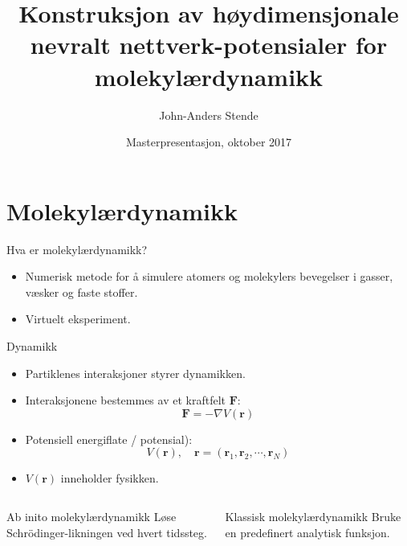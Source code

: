 \documentclass{beamer}
\title{Konstruksjon av høydimensjonale nevralt nettverk-potensialer for molekylærdynamikk}
\author{John-Anders Stende}
\institute{
  Fysisk institutt \\
  Universitetet i Oslo
}
\date{Masterpresentasjon, oktober 2017}
\begin{document}
\frame{\titlepage}

\section{Molekylærdynamikk}

\begin{frame}

\begin{block}{Hva er molekylærdynamikk?}
  \begin{itemize}
  \item Numerisk metode for å simulere atomers og molekylers bevegelser i gasser, væsker og faste stoffer.
  \item Virtuelt eksperiment.
  \end{itemize}
\end{block}

\end{frame}


\begin{frame}

\begin{block}{Dynamikk}
  \begin{itemize}
  \item Partiklenes interaksjoner styrer dynamikken.
  \item Interaksjonene bestemmes av et kraftfelt $\mathbf{F}$:
    \begin{equation*}
    \mathbf{F} = -\nabla V(\mathbf{r})
    \end{equation*}
  \item Potensiell energiflate / potensial):
    \begin{equation*}
      V(\mathbf{r}), \quad \mathbf{r} = (\mathbf{r}_1, \mathbf{r}_2, \cdots, \mathbf{r}_N)
    \end{equation*}
  \item $V(\mathbf{r})$ inneholder fysikken. 
  \end{itemize}
\end{block}

\end{frame}


\begin{frame}

\begin{columns}[T] %
  \begin{column}[T]{0.5\linewidth} %
    \begin{block}{Ab inito molekylærdynamikk}
    Løse Schrödinger-likningen ved hvert tidssteg.
    \end{block}
  \end{column}
  \begin{column}[T]{0.5\linewidth} %
    \begin{block}{Klassisk molekylærdynamikk}
    Bruke en predefinert analytisk funksjon.
    \end{block}
  \end{column}
\end{columns}

\end{frame}
\end{document}
